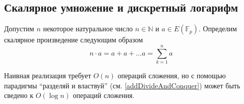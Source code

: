 \subsection{Скалярное умножение и дискретный логарифм}

Допустим $n$ некоторое натуральное число $n \in \mathbb{N}$ и $a \in
E\left(\mathbb{F}_p\right)$. Определим скалярное произведение
следующим образом
\[
n \cdot a = a + a + \dots a = \sum_{k=1}^n a
\] 

Наивная реализация требует $O\left(n\right)$ операций сложения, но с
помощью парадигмы ``разделяй и властвуй'' (см.
\autoref{addDivideAndConquer}) может быть сведено к $O\left(\log
n\right)$ операций сложения.



